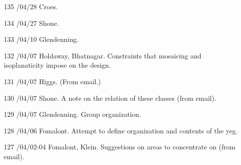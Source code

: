 \begin{enumerate}
\item[135]
/04/28 Croes.

\item[134]
/04/27 Shone.

\item[133]
/04/10 Glendenning.

\item[132]
/04/07 Holdaway, Bhatnagar.
\linebreak  Constraints that mosaicing and isoplanaticity impose on the design.

\item[131]
/04/07 Higgs.
\linebreak  (From email.)

\item[130]
/04/07 Shone.
\linebreak  A note on the relation of these classes (from email).

\item[129]
/04/07 Glendenning.
\linebreak  Group organization.

\item[128]
/04/06 Fomalont.
\linebreak  Attempt to define organization and contents of the yeg.

\item[127]
/04/02-04 Fomalont, Klein.
\linebreak  Suggestions on areas to concentrate on (from email).


\end{enumerate}
